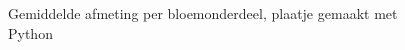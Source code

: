 \begin{figure}
    \caption{Gemiddelde afmeting per bloemonderdeel, plaatje gemaakt met Python}

    \label{fig:gemiddelde_afmeting}

\end{figure}

